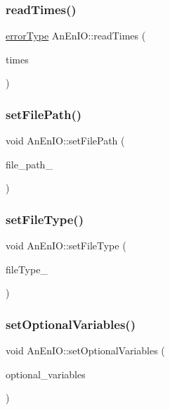\subsubsection{\texorpdfstring{read\+Times()}{readTimes()}}
{\footnotesize\ttfamily \mbox{\hyperlink{class_an_en_i_o_aa56bc1ec6610b86db4349bce20f9ead0}{error\+Type}} An\+En\+I\+O\+::read\+Times (\begin{DoxyParamCaption}\item[{\mbox{\hyperlink{classanen_time_1_1_times}{anen\+Time\+::\+Times}} \&}]{times }\end{DoxyParamCaption})}

\mbox{\label{class_an_en_i_o_a38bdc2d686737eba3812b3b41e073006}} 
\subsubsection{\texorpdfstring{set\+File\+Path()}{setFilePath()}}
{\footnotesize\ttfamily void An\+En\+I\+O\+::set\+File\+Path (\begin{DoxyParamCaption}\item[{std\+::string}]{file\+\_\+path\+\_\+ }\end{DoxyParamCaption})}

\mbox{\label{class_an_en_i_o_ac1a951fd63d9b109e4574143e077f9b2}} 
\subsubsection{\texorpdfstring{set\+File\+Type()}{setFileType()}}
{\footnotesize\ttfamily void An\+En\+I\+O\+::set\+File\+Type (\begin{DoxyParamCaption}\item[{std\+::string}]{file\+Type\+\_\+ }\end{DoxyParamCaption})}

\mbox{\label{class_an_en_i_o_abc499df15eac5fa3f203267723f5edfa}} 
\subsubsection{\texorpdfstring{set\+Optional\+Variables()}{setOptionalVariables()}}
{\footnotesize\ttfamily void An\+En\+I\+O\+::set\+Optional\+Variables (\begin{DoxyParamCaption}\item[{std\+::vector$<$ std\+::string $>$}]{optional\+\_\+variables }\end{DoxyParamCaption})}

